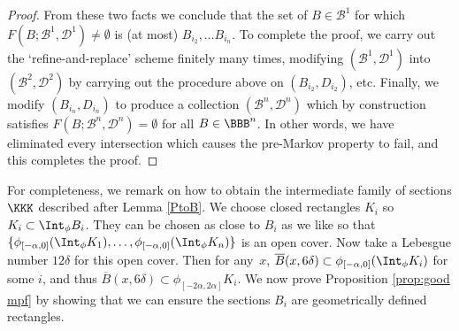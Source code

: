 \begin{proof}
From these two facts we conclude that the set of $B\!\in\!\mathcal{B}^1$ for which \hbox{$F(B;\mathcal{B}^1,\mathcal{D}^1)\!\neq\!\emptyset$} is (at most) $B_{i_2}, \ldots B_{i_n}$. To complete the proof, we carry out the `refine-and-replace' scheme finitely many times, modifying $(\mathcal{B}^1, \mathcal{D}^1)$ into $(\mathcal{B}^2, \mathcal{D}^2)$ by carrying out the procedure above on $(B_{i_2}, D_{i_2})$, etc. Finally, we modify $(B_{i_n}, D_{i_n})$ to produce a collection $(\mathcal{B}^n, \mathcal{D}^n)$ which by construction satisfies $F(B; \mathcal{B}^n,\mathcal{D}^n) = \emptyset$ for all $B \in \BBB^n$. In other words, we have eliminated every intersection which causes the pre-Markov property to fail, and this completes the proof.
\end{proof}

For completeness, we remark on how to obtain the intermediate family of sections $\KKK$ described after Lemma \ref{PtoB}. We choose closed rectangles $K_i$ so $K_i \subset \Int_\phi B_i$. They can be chosen as close to $B_i$ as we like so that $\{\phi_{[-\alpha, 0]} (\Int_\phi K_1), \ldots, \phi_{[-\alpha, 0]} (\Int_\phi K_n)\}$ is an open cover. Now take a Lebesgue number $12 \delta$ for this open cover. Then for any~$x$, $\overline B(x, 6\delta) \subset \phi_{[-\alpha, 0]} (\Int_\phi K_i)$ for some $i$, and thus $\overline B(x, 6\delta) \subset \phi_{[-2 \alpha, 2 \alpha]}K_i$. We now prove Proposition \ref{prop:good mpf} by showing that we can ensure the sections $B_i$ are geometrically defined rectangles.

